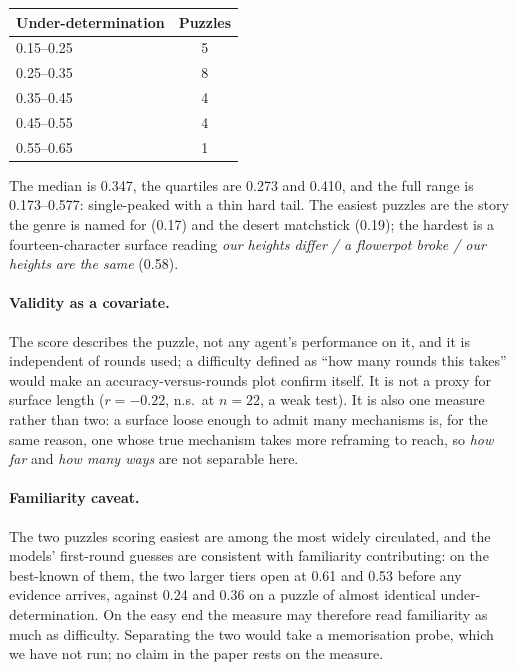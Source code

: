 \documentclass{article}
\begin{document}
\begin{center}\small
\begin{tabular}{@{}lc@{}}
\toprule
\textbf{Under-determination} & \textbf{Puzzles} \\
\midrule
0.15--0.25 & 5 \\
0.25--0.35 & 8 \\
0.35--0.45 & 4 \\
0.45--0.55 & 4 \\
0.55--0.65 & 1 \\
\bottomrule
\end{tabular}
\end{center}

The median is 0.347, the quartiles are 0.273 and 0.410, and the full range
is 0.173--0.577: single-peaked with a thin hard tail. The easiest puzzles are
the story the genre is named for (0.17) and the desert matchstick (0.19); the
hardest is a fourteen-character surface reading \emph{our heights differ / a
flowerpot broke / our heights are the same} (0.58).

\paragraph{Validity as a covariate.} The score describes the puzzle, not any
agent's performance on it, and it is independent of rounds used; a difficulty
defined as ``how many rounds this takes'' would make an accuracy-versus-rounds
plot confirm itself. It is not a proxy for surface length ($r=-0.22$, n.s.\ at
$n=22$, a weak test). It is also one measure rather than two: a surface loose
enough to admit many mechanisms is, for the same reason, one whose true
mechanism takes more reframing to reach, so \emph{how far} and \emph{how many
ways} are not separable here.

\paragraph{Familiarity caveat.} The two puzzles scoring easiest are among the
most widely circulated, and the models' first-round guesses are consistent
with familiarity contributing: on the best-known of them, the two larger
tiers open at 0.61 and 0.53 before any evidence arrives, against 0.24 and
0.36 on a puzzle of almost identical under-determination. On the easy end the
measure may therefore read familiarity as much as difficulty. Separating the
two would take a memorisation probe, which we have not run; no claim in the
paper rests on the measure.
\end{document}
